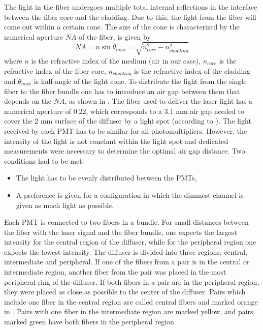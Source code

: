 The light in the fiber undergoes multiple total internal reflections in the interface between the fiber core and the cladding. 
Due to this, the light from the fiber will come out within a certain cone. 
The size of the cone is characterized by the numerical aperture $NA$ of the fiber, is given by
\begin{equation}
\label{eq:numericalApperture}
 NA = n \sin{\theta_{max}} = \sqrt{n_{core}^2 - n_{cladding}^2}
\end{equation}
where $n$ is the refractive index of the medium (air in our case), $n_{core}$ is the refractive index of the fiber core, $n_{cladding}$ is the refractive index 
of the cladding and $\theta_{max}$ is half-angle of the light cone. 
To distribute the light from the single fiber to the fiber bundle one has to introduce an air gap between them that depends on the $NA$, 
as shown in .
The fiber used to deliver the laser light has a numerical aperture of 0.22, which corresponds to a 3.1 mm air gap needed to cover the 2 mm surface of the diffuser by a light spot (according to ).
The light received by each PMT has to be similar for all photomultipliers.
However, the intensity of the light is not constant within the light spot and dedicated measurements were necessary to determine the optimal air gap distance.
Two conditions had to be met:
\begin{itemize}
 \item The light has to be evenly distributed between the PMTs,
 \item A preference is given for a configuration in which the dimmest channel is given as much light as possible.
\end{itemize}
Each PMT is connected to two fibers in a bundle. 
For small distances between the fiber with the laser signal and the fiber bundle, one expects the largest intensity for the central 
region of the diffuser, while for the peripheral region one expects the lowest intensity.
The diffuser is divided into three regions: central, intermediate and peripheral. 
If one of the fibers from a pair is in the central or intermediate region, another fiber from the pair was placed in the most peripheral ring of the diffuser.
If both fibers in a pair are in the peripheral region, they were placed as close as possible to the center of the diffuser.
Pairs which include one fiber in the central region are called central fibers and marked orange in .
Pairs with one fiber in the intermediate region are marked yellow, and pairs marked green have both fibers in the peripheral region.

